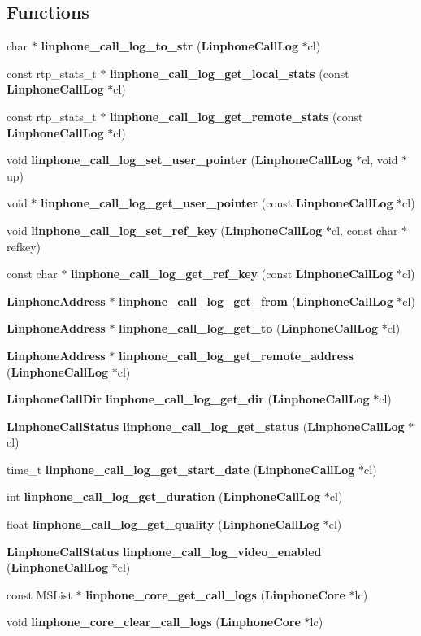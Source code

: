 \subsection*{Functions}
\begin{DoxyCompactItemize}
\item 
char $\ast$ {\bf linphone\-\_\-call\-\_\-log\-\_\-to\-\_\-str} ({\bf Linphone\-Call\-Log} $\ast$cl)
\item 
const rtp\-\_\-stats\-\_\-t $\ast$ {\bf linphone\-\_\-call\-\_\-log\-\_\-get\-\_\-local\-\_\-stats} (const {\bf Linphone\-Call\-Log} $\ast$cl)
\item 
const rtp\-\_\-stats\-\_\-t $\ast$ {\bf linphone\-\_\-call\-\_\-log\-\_\-get\-\_\-remote\-\_\-stats} (const {\bf Linphone\-Call\-Log} $\ast$cl)
\item 
void {\bf linphone\-\_\-call\-\_\-log\-\_\-set\-\_\-user\-\_\-pointer} ({\bf Linphone\-Call\-Log} $\ast$cl, void $\ast$up)
\item 
void $\ast$ {\bf linphone\-\_\-call\-\_\-log\-\_\-get\-\_\-user\-\_\-pointer} (const {\bf Linphone\-Call\-Log} $\ast$cl)
\item 
void {\bf linphone\-\_\-call\-\_\-log\-\_\-set\-\_\-ref\-\_\-key} ({\bf Linphone\-Call\-Log} $\ast$cl, const char $\ast$refkey)
\item 
const char $\ast$ {\bf linphone\-\_\-call\-\_\-log\-\_\-get\-\_\-ref\-\_\-key} (const {\bf Linphone\-Call\-Log} $\ast$cl)
\item 
{\bf Linphone\-Address} $\ast$ {\bf linphone\-\_\-call\-\_\-log\-\_\-get\-\_\-from} ({\bf Linphone\-Call\-Log} $\ast$cl)
\item 
{\bf Linphone\-Address} $\ast$ {\bf linphone\-\_\-call\-\_\-log\-\_\-get\-\_\-to} ({\bf Linphone\-Call\-Log} $\ast$cl)
\item 
{\bf Linphone\-Address} $\ast$ {\bf linphone\-\_\-call\-\_\-log\-\_\-get\-\_\-remote\-\_\-address} ({\bf Linphone\-Call\-Log} $\ast$cl)
\item 
{\bf Linphone\-Call\-Dir} {\bf linphone\-\_\-call\-\_\-log\-\_\-get\-\_\-dir} ({\bf Linphone\-Call\-Log} $\ast$cl)
\item 
{\bf Linphone\-Call\-Status} {\bf linphone\-\_\-call\-\_\-log\-\_\-get\-\_\-status} ({\bf Linphone\-Call\-Log} $\ast$cl)
\item 
time\-\_\-t {\bf linphone\-\_\-call\-\_\-log\-\_\-get\-\_\-start\-\_\-date} ({\bf Linphone\-Call\-Log} $\ast$cl)
\item 
int {\bf linphone\-\_\-call\-\_\-log\-\_\-get\-\_\-duration} ({\bf Linphone\-Call\-Log} $\ast$cl)
\item 
float {\bf linphone\-\_\-call\-\_\-log\-\_\-get\-\_\-quality} ({\bf Linphone\-Call\-Log} $\ast$cl)
\item 
{\bf Linphone\-Call\-Status} {\bf linphone\-\_\-call\-\_\-log\-\_\-video\-\_\-enabled} ({\bf Linphone\-Call\-Log} $\ast$cl)
\item 
const M\-S\-List $\ast$ {\bf linphone\-\_\-core\-\_\-get\-\_\-call\-\_\-logs} ({\bf Linphone\-Core} $\ast$lc)
\item 
void {\bf linphone\-\_\-core\-\_\-clear\-\_\-call\-\_\-logs} ({\bf Linphone\-Core} $\ast$lc)
\end{DoxyCompactItemize}


